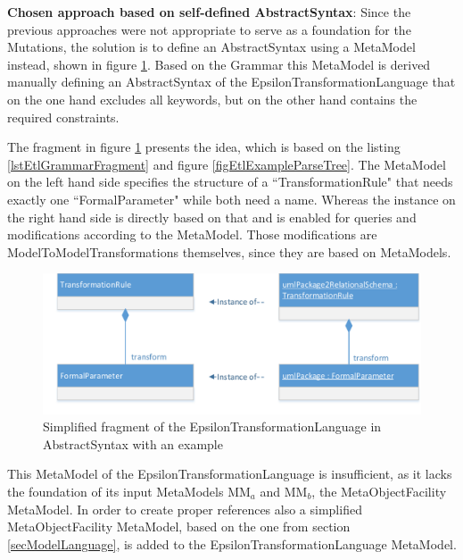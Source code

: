 \textbf{Chosen approach based on self-defined \gls{AbstractSyntax}}: Since the previous approaches were not appropriate to serve as a foundation for the \glspl{Mutation}, the solution is to define an \gls{AbstractSyntax} using a \gls{MetaModel} instead, shown in figure \ref{figEtlSimplifiedFragmentOfAbstractSyntaxWithExample}. Based on the \gls{Grammar} this \gls{MetaModel} is derived manually defining an \gls{AbstractSyntax} of the \gls{EpsilonTransformationLanguage} that on the one hand excludes all keywords, but on the other hand contains the required constraints. 

The fragment in figure \ref{figEtlSimplifiedFragmentOfAbstractSyntaxWithExample} presents the idea, which is based on the listing \ref{lstEtlGrammarFragment} and figure \ref{figEtlExampleParseTree}. The \gls{MetaModel} on the left hand side specifies the structure of a ``TransformationRule" that needs exactly one ``FormalParameter" while both need a name. Whereas the instance on the right hand side is directly based on that and is enabled for queries and modifications according to the \gls{MetaModel}. Those modifications are \glspl{ModelToModelTransformation} themselves, since they are based on \glspl{MetaModel}.

\begin{figure}[htb]
	\centering
	\includegraphics[scale=0.6]{Images/EtlSimplifiedFragmentOfAbstractSyntaxWithExample.pdf} 
	\caption{Simplified fragment of the \Gls{EpsilonTransformationLanguage} in \gls{AbstractSyntax} with an example}
	\label{figEtlSimplifiedFragmentOfAbstractSyntaxWithExample}
\end{figure}

This \gls{MetaModel} of the \gls{EpsilonTransformationLanguage} is insufficient, as it lacks the foundation of its input \glspl{MetaModel} MM$_a$ and MM$_b$, the \gls{MetaObjectFacility} \gls{MetaModel}. In order to create proper references also a simplified \gls{MetaObjectFacility} \gls{MetaModel}, based on the one from section \ref{secModelLanguage}, is added to the \gls{EpsilonTransformationLanguage} \gls{MetaModel}.

